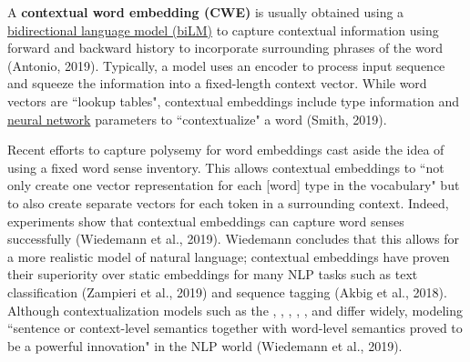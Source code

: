 A \textbf{contextual word embedding (CWE)} is usually obtained using a \hyperref[sec:BidirectionalLM]{bidirectional language model (biLM)} to capture contextual information using forward and backward history to incorporate surrounding phrases of the word (Antonio, 2019). Typically, a model uses an encoder to process input sequence and squeeze the information into a fixed-length context vector. While word vectors are ``lookup tables", contextual embeddings include type information and \hyperref[sec:NeuralLM]{neural network} parameters to ``contextualize" a word (Smith, 2019). 

Recent efforts to capture polysemy for word embeddings cast aside the idea of using a fixed word sense inventory. This allows contextual embeddings to ``not only create one vector representation for each [word] type in the vocabulary" but to also create separate vectors for each token in a surrounding context. Indeed, experiments show that contextual embeddings can capture word senses successfully (Wiedemann et al., 2019). Wiedemann concludes that this allows for a more realistic model of natural language; contextual embeddings have proven their superiority over static embeddings for many NLP tasks such as text classification (Zampieri et al., 2019) and sequence tagging (Akbig et al., 2018). Although contextualization models such as the , , , , , and  differ widely, modeling ``sentence or context-level semantics together with word-level semantics proved to be a powerful innovation" in the NLP world (Wiedemann et al., 2019). 


